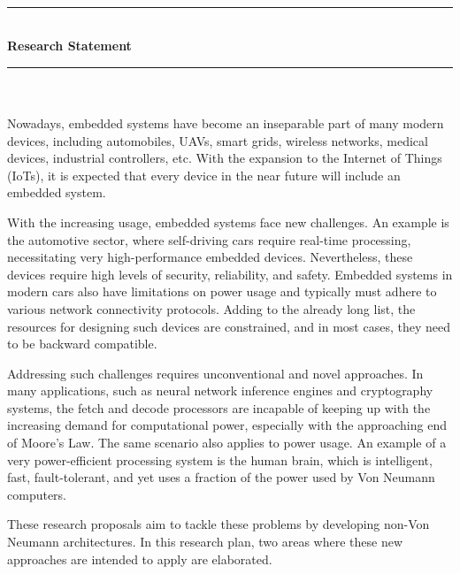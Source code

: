 \newpage
  \thispagestyle{empty}
 \phantom \quad \\
\hrule \phantom \quad  \vspace*{1\baselineskip}  \\
 {\bf Research Statement}
 \vspace*{1\baselineskip}  \hrule \phantom \quad \\
\vspace*{3\baselineskip} \phantom \quad \\
 
 
 Nowadays, embedded systems have become an inseparable part of many modern devices, including automobiles, UAVs, smart grids, wireless networks, medical devices, industrial controllers, etc. With the expansion to the Internet of Things (IoTs), it is expected that every device in the near future will include an embedded system.

With the increasing usage, embedded systems face new challenges. An example is the automotive sector, where self-driving cars require real-time processing, necessitating very high-performance embedded devices. Nevertheless, these devices require high levels of security, reliability, and safety. Embedded systems in modern cars also have limitations on power usage and typically must adhere to various network connectivity protocols. Adding to the already long list, the resources for designing such devices are constrained, and in most cases, they need to be backward compatible.

Addressing such challenges requires unconventional and novel approaches. In many applications, such as neural network inference engines and cryptography systems, the fetch and decode processors are incapable of keeping up with the increasing demand for computational power, especially with the approaching end of Moore's Law. The same scenario also applies to power usage. An example of a very power-efficient processing system is the human brain, which is intelligent, fast, fault-tolerant, and yet uses a fraction of the power used by Von Neumann computers.

These research proposals aim to tackle these problems by developing non-Von Neumann architectures. In this research plan, two areas where these new approaches are intended to apply are elaborated.
 
 
 
 
 
 
 
 
 
 
 
